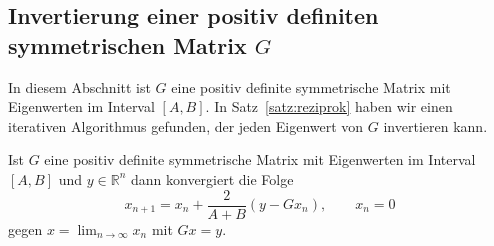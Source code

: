%
%
\subsection{Invertierung einer positiv definiten symmetrischen Matrix $G$
\label{subsection:ginv}}
In diesem Abschnitt ist $G$ eine positiv definite symmetrische Matrix 
mit Eigenwerten im Interval $[A,B]$.
In Satz~\ref{satz:reziprok} haben wir einen iterativen Algorithmus
gefunden, der jeden Eigenwert von $G$ invertieren kann.


\begin{satz}
Ist $G$ eine positiv definite symmetrische Matrix mit Eigenwerten im
Interval $[A,B]$ und $y\in\mathbb R^n$ dann konvergiert die Folge
\[
x_{n+1} = x_n + \frac{2}{A+B} (y - Gx_n),\qquad x_n = 0
\]
gegen 
$
x=\lim_{n\to\infty} x_n
$
mit $Gx=y$.
\end{satz}

